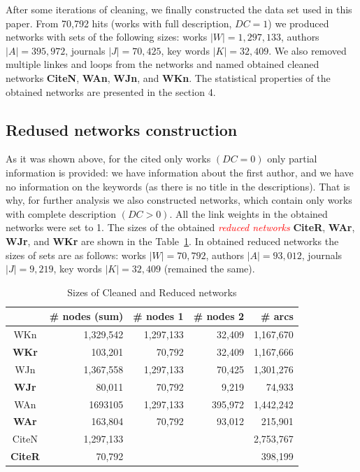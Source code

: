 \documentclass[11pt]{article} %
\newcommand{\keyw}[1]{\textcolor{red}{\emph{#1}}}
\begin{document}
After some iterations of cleaning, we finally constructed the data set used in this paper. From 70,792 hits (works with full description, $DC=1$) we produced networks with sets of the following sizes: works $|W| = 1,297,133$, authors $|A| = 395,972$, journals $|J| = 70,425$, key words $|K| = 32,409$. We also removed multiple linkes and loops from the networks and named obtained cleaned networks \textbf{CiteN}, \textbf{WAn}, \textbf{WJn}, and \textbf{WKn}. The statistical properties of the obtained networks are presented in the section 4. \medskip  

\subsection{Redused networks construction}

As it was shown above, for the cited only  works  $(DC=0)$ only partial information is provided: we have information about the first author, and we have no information on the keywords (as there is no title in the descriptions). That is why, for further analysis we also constructed networks, which contain only works with complete description $(DC>0)$. All the link weights in the obtained networks were set to 1. The sizes of the obtained \keyw{reduced networks} \textbf{CiteR}, \textbf{WAr}, \textbf{WJr}, and \textbf{WKr} are shown in the Table~\ref{rednet}. In obtained reduced networks  the sizes of sets are as follows: works $|W| = 70,792$, authors $|A| = 93,012$, journals $|J| = 9,219$, key words $|K| = 32,409$ (remained the same).\medskip 

\begin{table}
\caption{Sizes of Cleaned and Reduced networks}\label{rednet}\medskip
\begin{center}
\begin{tabular}{c|r|r|r|r}
	&\# nodes (sum)	& \# nodes 1	&\# nodes 2	& \# arcs \\ \hline		 
WKn &  	1,329,542	& 1,297,133	& 32,409	& 1,167,670 \\
\textbf{WKr}	& 103,201	& 70,792	& 32,409	& 1,167,666 \\ \hline	
WJn & 	1,367,558	& 1,297,133	& 70,425	& 1,301,276 \\ 
\textbf{WJr} 	& 80,011	& 70,792	& 9,219	& 74,933 \\ \hline	
WAn	& 1693105	& 1,297,133	& 395,972	& 1,442,242 \\ 
\textbf{WAr}	& 163,804	& 70,792	& 93,012	& 215,901 \\ \hline	
CiteN & 1,297,133 & & & 2,753,767\\ 
\textbf{CiteR} & 70,792 & & & 398,199 \\ \hline
\end{tabular}				
\end{center}
\end{table}
\end{document}
